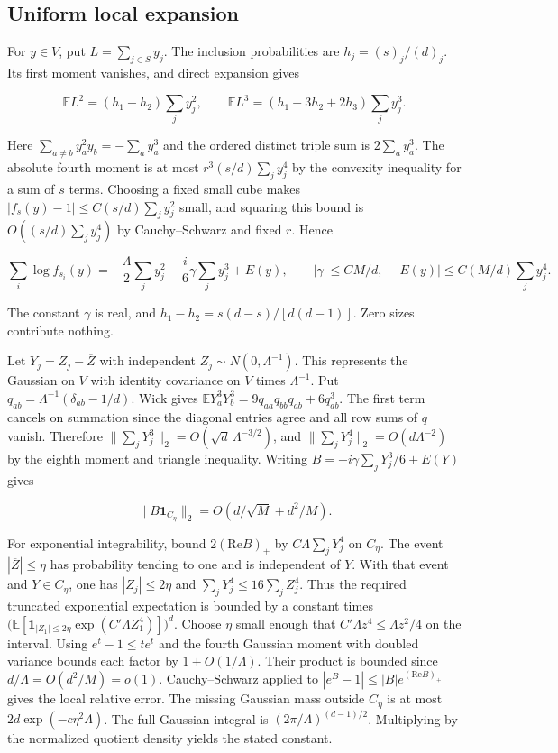 \subsection{Uniform local expansion}

For $y\in V$, put $L=\sum_{j\in S}y_j$. The inclusion probabilities are $h_j=(s)_j/(d)_j$. Its first moment vanishes, and direct expansion gives

\begin{equation*}
\mathbb E L^2=(h_1-h_2)\sum_j y_j^2,\qquad
\mathbb E L^3=(h_1-3h_2+2h_3)\sum_j y_j^3.
\end{equation*}

Here $\sum_{a\ne b}y_a^2y_b=-\sum_a y_a^3$ and the ordered distinct triple sum is $2\sum_a y_a^3$. The absolute fourth moment is at most $r^3(s/d)\sum_j y_j^4$ by the convexity inequality for a sum of $s$ terms. Choosing a fixed small cube makes $|f_s(y)-1|\le C(s/d)\sum_j y_j^2$ small, and squaring this bound is $O((s/d)\sum_j y_j^4)$ by Cauchy--Schwarz and fixed $r$. Hence

\begin{equation*}
\sum_i\log f_{s_i}(y)=-\frac{\Lambda}2\sum_j y_j^2
-\frac{i}{6}\gamma\sum_j y_j^3+E(y),\qquad
|\gamma|\le CM/d,\quad |E(y)|\le C(M/d)\sum_j y_j^4.
\end{equation*}

The constant $\gamma$ is real, and $h_1-h_2=s(d-s)/[d(d-1)]$. Zero sizes contribute nothing.

Let $Y_j=Z_j-\overline Z$ with independent $Z_j\sim N(0,\Lambda^{-1})$. This represents the Gaussian on $V$ with identity covariance on $V$ times $\Lambda^{-1}$. Put $q_{ab}=\Lambda^{-1}(\delta_{ab}-1/d)$. Wick gives $\mathbb E Y_a^3Y_b^3=9q_{aa}q_{bb}q_{ab}+6q_{ab}^3$. The first term cancels on summation since the diagonal entries agree and all row sums of $q$ vanish. Therefore $\|\sum_jY_j^3\|_2=O(\sqrt d\,\Lambda^{-3/2})$, and $\|\sum_jY_j^4\|_2=O(d\Lambda^{-2})$ by the eighth moment and triangle inequality. Writing $B=-i\gamma\sum_jY_j^3/6+E(Y)$ gives

\begin{equation*}
\|B\mathbf 1_{C_\eta}\|_2=O(d/\sqrt M+d^2/M).
\end{equation*}

For exponential integrability, bound $2(\mathrm{Re}B)_+$ by $C\Lambda\sum_jY_j^4$ on $C_\eta$. The event $|\overline Z|\le\eta$ has probability tending to one and is independent of $Y$. With that event and $Y\in C_\eta$, one has $|Z_j|\le2\eta$ and $\sum_jY_j^4\le16\sum_j Z_j^4$. Thus the required truncated exponential expectation is bounded by a constant times
$\bigl(\mathbb E[\mathbf 1_{|Z_1|\le2\eta}\exp(C'\Lambda Z_1^4)]\bigr)^d$.
Choose $\eta$ small enough that $C'\Lambda z^4\le\Lambda z^2/4$ on the interval. Using $e^t-1\le te^t$ and the fourth Gaussian moment with doubled variance bounds each factor by $1+O(1/\Lambda)$. Their product is bounded since $d/\Lambda=O(d^2/M)=o(1)$. Cauchy--Schwarz applied to $|e^B-1|\le|B|e^{(\mathrm{Re}B)_+}$ gives the local relative error. The missing Gaussian mass outside $C_\eta$ is at most $2d\exp(-c\eta^2\Lambda)$. The full Gaussian integral is $(2\pi/\Lambda)^{(d-1)/2}$. Multiplying by the normalized quotient density yields the stated constant.

